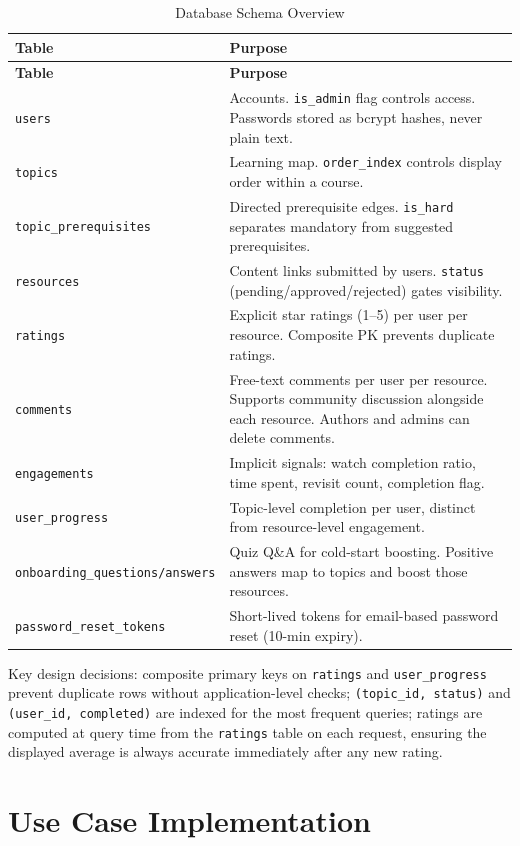 \documentclass[12pt,a4paper]{report}
\begin{document}
\begin{longtable}{p{} p{}}
\caption{Database Schema Overview}\label{tab:schema}\\
\toprule
\textbf{Table} & \textbf{Purpose} \\
\midrule
\endfirsthead
\toprule
\textbf{Table} & \textbf{Purpose} \\
\midrule
\endhead
\texttt{users} & Accounts. \texttt{is\_admin} flag controls access. Passwords stored as bcrypt hashes, never plain text. \\
\texttt{topics} & Learning map. \texttt{order\_index} controls display order within a course. \\
\texttt{topic\_prerequisites} & Directed prerequisite edges. \texttt{is\_hard} separates mandatory from suggested prerequisites. \\
\texttt{resources} & Content links submitted by users. \texttt{status} (pending/approved/rejected) gates visibility. \\
\texttt{ratings} & Explicit star ratings (1--5) per user per resource. Composite PK prevents duplicate ratings. \\
\texttt{comments} & Free-text comments per user per resource. Supports community discussion alongside each resource. Authors and admins can delete comments. \\
\texttt{engagements} & Implicit signals: watch completion ratio, time spent, revisit count, completion flag. \\
\texttt{user\_progress} & Topic-level completion per user, distinct from resource-level engagement. \\
\texttt{onboarding\_questions/answers} & Quiz Q\&A for cold-start boosting. Positive answers map to topics and boost those resources. \\
\texttt{password\_reset\_tokens} & Short-lived tokens for email-based password reset (10-min expiry). \\
\bottomrule
\end{longtable}

Key design decisions: composite primary keys on \texttt{ratings} and \texttt{user\_progress} prevent duplicate rows without application-level checks; \texttt{(topic\_id, status)} and \texttt{(user\_id, completed)} are indexed for the most frequent queries; ratings are computed at query time from the \texttt{ratings} table on each request, ensuring the displayed average is always accurate immediately after any new rating.

\section{Use Case Implementation}
\end{document}

